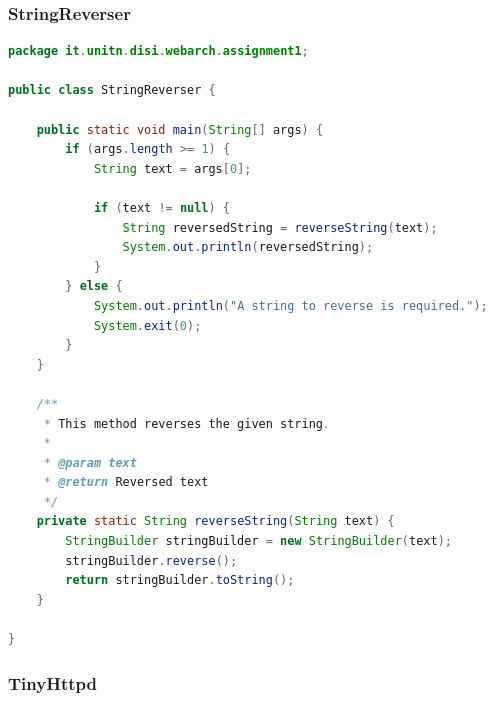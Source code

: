 \documentclass{article}
\begin{document}
\subsubsection{StringReverser}

\begin{lstlisting}[label=lst:01_part1_impl_stringreverser_code, caption=CLI command to start a GitLab runner in a Docker container, language=java, numbers=none]
package it.unitn.disi.webarch.assignment1;

public class StringReverser {

    public static void main(String[] args) {
        if (args.length >= 1) {
            String text = args[0];

            if (text != null) {
                String reversedString = reverseString(text);
                System.out.println(reversedString);
            }
        } else {
            System.out.println("A string to reverse is required.");
            System.exit(0);
        }
    }

    /**
     * This method reverses the given string.
     *
     * @param text
     * @return Reversed text
     */
    private static String reverseString(String text) {
        StringBuilder stringBuilder = new StringBuilder(text);
        stringBuilder.reverse();
        return stringBuilder.toString();
    }

}
\end{lstlisting}

\subsubsection{TinyHttpd}
\end{document}

